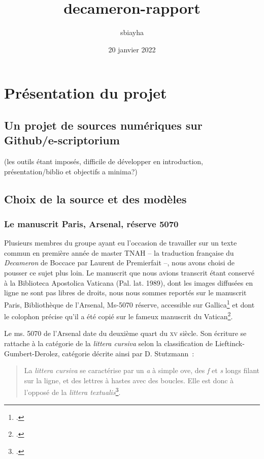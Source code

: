\documentclass{article}
\title{decameron-rapport}
\author{sbiayha }
\date{20 janvier 2022}
\newcommand{\siecle}[1]{\textsc{#1}\ieme}
\begin{document}
\maketitle

\section{Présentation du projet}
\subsection{Un projet de sources numériques sur Github/e-scriptorium}
(les outils étant imposés, difficile de développer en introduction, présentation/biblio et objectifs a minima?)

\subsection{Choix de la source et des modèles}

\subsubsection{Le manuscrit Paris, Arsenal, réserve 5070}
Plusieurs membres du groupe ayant eu l'occasion de travailler sur un texte commun en première année de master TNAH – la traduction française du \textit{Decameron} de Boccace par Laurent de Premierfait –, nous avons choisi de pousser ce sujet plus loin.
Le manuscrit que nous avions transcrit étant conservé à la Biblioteca Apostolica Vaticana (Pal. lat. 1989), dont les images diffusées en ligne ne sont pas libres de droits, nous nous sommes reportés sur le manuscrit Paris, Bibliothèque de l'Arsenal, Ms-5070 réserve, accessible sur Gallica\footcite{ParisBibliothequeArsenal} et dont le colophon précise qu'il a été copié sur le fameux manuscrit du Vatican\footcite{institutderechercheetdhistoiredestextesNoticePARISBibliotheque2012a}.

Le ms. 5070 de l'Arsenal date du deuxième quart du \siecle{xv} siècle. Son écriture se rattache à la catégorie de la \textit{littera cursiva} selon la classification de Lieftinck-Gumbert-Derolez, catégorie décrite ainsi par D. Stutzmann~:
\begin{quotation}La \textit{littera cursiva} se caractérise par un \textit{a} à simple ove, des \textit{f} et \textit{s} longs filant sur la ligne, et des lettres à hastes avec des boucles. Elle est donc à l’opposé de la \textit{littera textualis}\footcite{stutzmannEcrituresGothiquesLivresques2022}.\end{quotation}
\end{document}
